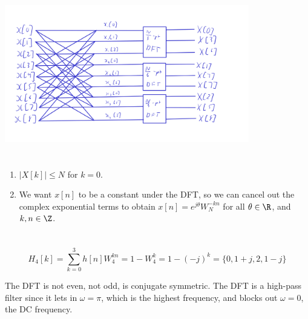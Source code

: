 \documentclass{article}
\begin{document}
\subsection{}

\begin{center}
    \includegraphics[width=0.8\textwidth]{q6d.png}
\end{center}

\newpage
\section{}

\begin{enumerate}
    \item \(|X[k]| \leqslant N\) for \(k = 0\).
    \item We want \(x[n]\) to be a constant under the DFT, so we can cancel out the complex exponential terms to obtain \(x[n] = e^{j \theta} W_N^{-kn}\) for all \(\theta \in \R\), and \(k, n \in \Z\).
\end{enumerate}

\newpage
\section{}

\subsection{}

\begin{equation}
    H_4[k] = \sum_{k = 0}^3 h[n] W_4^{kn} = 1 - W_4^k = 1 - (-j)^k = \{0, 1 + j, 2, 1 - j\}
\end{equation}
\begin{center}
\end{center}
The DFT is not even, not odd, is conjugate symmetric.
The DFT is a high-pass filter since it lets in \(\omega = \pi\), which is the highest frequency, and blocks out \(\omega = 0\), the DC frequency.
\end{document}
